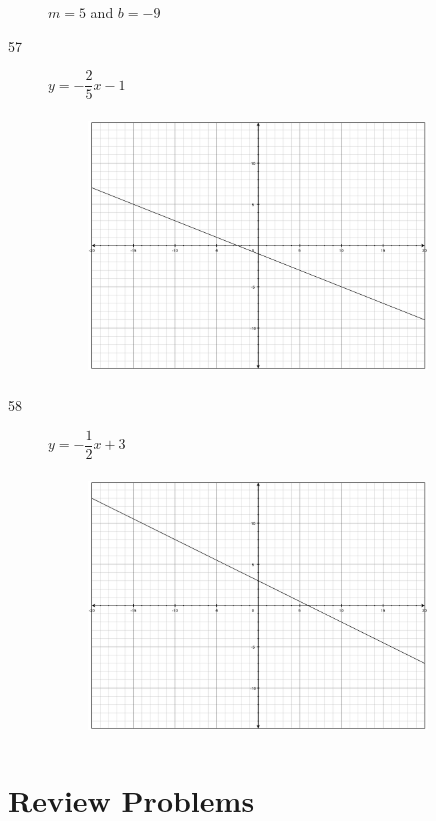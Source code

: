 \documentclass[fleqn,addpoints]{exam}
\begin{document}
\begin{description}
$m=5$ and $b = -9$

\item[57]
$y = - \dfrac{2}{5} x - 1$

\begin{figure}[H]
  \includegraphics[width=9cm,height=7cm]{p386/57}
\end{figure}

\item[58]
$y = - \dfrac{1}{2} x + 3$

\begin{figure}[H]
  \includegraphics[width=9cm,height=7cm]{p386/58}
\end{figure}

\end{description}

\fi

\section{Review Problems}

 
\end{document}
